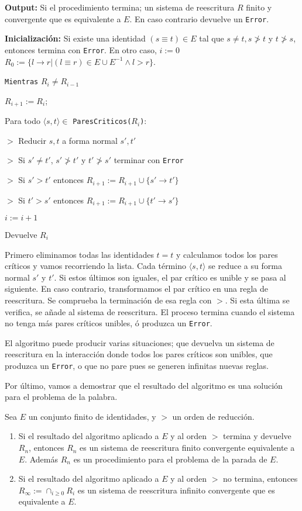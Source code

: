 \textbf{Output:} Si el procedimiento termina; un sistema de
reescritura $R$ finito y convergente que es equivalente a $E$. En caso
contrario devuelve un \texttt{Error}.

\textbf{Inicialización:}
Si existe una identidad $(s \equiv t) \in E$ tal que
$s \not = t, s \not > t$ y $t \not > s$, entonces termina con
\texttt{Error}.
En otro caso,
$i := 0$
$R_0 := \{l \rightarrow r | (l \equiv r) \in E \cup E^{-1} \wedge l > r \}$.

\texttt{Mientras} $R_i \not = R_{i-1}$

$R_{i+1} := R_i$;

Para todo $\langle s, t \rangle \in$ \texttt{ParesCriticos($R_i$)}:

$>$ Reducir $s,t$ a forma normal $s', t'$

$>$ Si $s' \not = t'$, $s' \not > t'$ y $t' \not > s'$ terminar con \texttt{Error}

$>$ Si $s' > t'$ entonces $R_{i+1} := R_{i+1} \cup \{s' \rightarrow t'\}$

$>$ Si $t' > s'$ entonces $R_{i+1} := R_{i+1} \cup \{t' \rightarrow s'\}$

$i := i+1$

Devuelve $R_i$

\hrulefill

Primero eliminamos todas las identidades $t = t$ y calculamos todos
los pares críticos y vamos recorriendo la lista. Cada término
$\langle s, t \rangle$ se reduce a su forma normal $s'$ y $t'$. Si
estos últimos son iguales, el par crítico es unible y se pasa al
siguiente. En caso contrario, transformamos el par crítico en una
regla de reescritura. Se comprueba la terminación de esa regla con
$>$. Si esta última se verifica, se añade al sistema de
reescritura. El proceso termina cuando el sistema no tenga más pares
críticos unibles, ó produzca un \texttt{Error}.

El algoritmo puede producir varias situaciones; que devuelva un
sistema de reescritura en la interacción donde todos los pares
críticos son unibles, que produzca un \texttt{Error}, o que no pare
pues se generen infinitas nuevas reglas.

Por último, vamos a demostrar que el resultado del algoritmo es una
solución para el problema de la palabra.

\begin{teor}
  Sea $E$ un conjunto finito de identidades, y $>$ un orden de
  reducción.

  \begin{enumerate}
  \item Si el resultado del algoritmo aplicado a $E$ y al orden $>$
    termina y devuelve $R_n$, entonces $R_n$ es un sistema de
    reescritura finito convergente equivalente a $E$. Además $R_n$ es
    un procedimiento para el problema de la parada de $E$.

  \item Si el resultado del algoritmo aplicado a $E$ y al orden $>$ no
    termina, entonces $R_\infty := \cap_{i \geq 0} R_i$ es un sistema
    de reescritura infinito convergente que es equivalente a $E$.
  \end{enumerate}

\end{teor}

